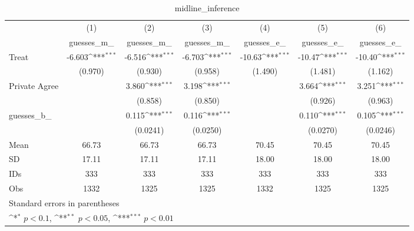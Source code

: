 \begin{table}[htbp]\centering
\def\sym#1{\ifmmode^{#1}\else\(^{#1}\)\fi}
\caption{midline\_inference}
\begin{tabular}{l*{6}{c}}
\hline\hline
                                &\multicolumn{1}{c}{(1)}&\multicolumn{1}{c}{(2)}&\multicolumn{1}{c}{(3)}&\multicolumn{1}{c}{(4)}&\multicolumn{1}{c}{(5)}&\multicolumn{1}{c}{(6)}\\
                                &\multicolumn{1}{c}{guesses\_m\_}&\multicolumn{1}{c}{guesses\_m\_}&\multicolumn{1}{c}{guesses\_m\_}&\multicolumn{1}{c}{guesses\_e\_}&\multicolumn{1}{c}{guesses\_e\_}&\multicolumn{1}{c}{guesses\_e\_}\\
\hline
Treat                           &   -6.603\sym{***}&   -6.516\sym{***}&   -6.703\sym{***}&   -10.63\sym{***}&   -10.47\sym{***}&   -10.40\sym{***}\\
                                &  (0.970)         &  (0.930)         &  (0.958)         &  (1.490)         &  (1.481)         &  (1.162)         \\
Private Agree                   &                  &    3.860\sym{***}&    3.198\sym{***}&                  &    3.664\sym{***}&    3.251\sym{***}\\
                                &                  &  (0.858)         &  (0.850)         &                  &  (0.926)         &  (0.963)         \\
guesses\_b\_                      &                  &    0.115\sym{***}&    0.116\sym{***}&                  &    0.110\sym{***}&    0.105\sym{***}\\
                                &                  & (0.0241)         & (0.0250)         &                  & (0.0270)         & (0.0246)         \\
\hline
Mean                            &    66.73         &    66.73         &    66.73         &    70.45         &    70.45         &    70.45         \\
SD                              &    17.11         &    17.11         &    17.11         &    18.00         &    18.00         &    18.00         \\
IDs                             &      333         &      333         &      333         &      333         &      333         &      333         \\
Obs                             &     1332         &     1325         &     1325         &     1332         &     1325         &     1325         \\
\hline\hline
\multicolumn{7}{l}{\footnotesize Standard errors in parentheses}\\
\multicolumn{7}{l}{\footnotesize \sym{*} \(p<0.1\), \sym{**} \(p<0.05\), \sym{***} \(p<0.01\)}\\
\end{tabular}
\end{table}
